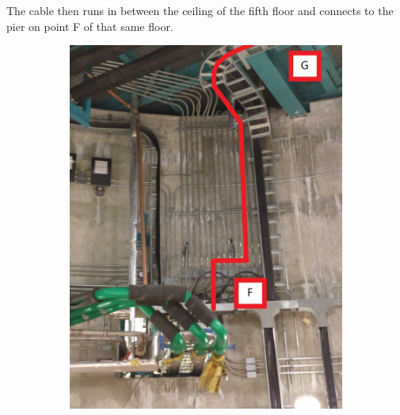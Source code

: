   The cable then runs in between the ceiling of the fifth floor and connects to the pier on point F of that same floor.

\begin{figure}
  \centering
  \begin{subfigure}{0.48\textwidth}
    \centering
    \includegraphics[width=\textwidth]{images/19.jpg}
  \end{subfigure}
  \hfill
  \begin{subfigure}{0.48\textwidth}
    \centering

\end{subfigure}
\end{figure}
